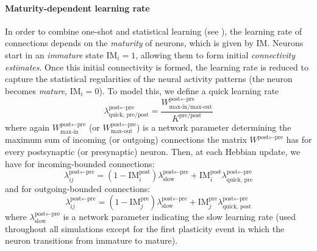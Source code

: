 \documentclass{article}
\begin{document}
\paragraph*{Maturity-dependent learning rate}
In order to combine one-shot and statistical learning (see ), the learning rate of connections depends on the \textit{maturity} of neurons, which is given by $\textrm{IM}$. Neurons start in an \textit{immature} state $\textrm{IM}_i = 1$, allowing them to form initial \textit{connectivity estimates}. Once this initial connectivity is formed, the learning rate is reduced to capture the statistical regularities of the neural activity patterns (the neuron becomes \textit{mature}, $\textrm{IM}_i = 0$). To model this, we define a quick learning rate
\begin{equation}
        \lambda^{\textrm{post}\leftarrow\textrm{pre}}_\textrm{quick, pre/post} = \frac{W^{\textrm{post}\leftarrow\textrm{pre}}_\textrm{max-in/max-out}}{K^\textrm{pre/post}} 
        \label{eq:quick_lambda}
\end{equation}
where again $W^{\textrm{post}\leftarrow\textrm{pre}}_\textrm{max-in}$ (or $W^{\textrm{post}\leftarrow\textrm{pre}}_\textrm{max-out}$) is a network parameter determining the maximum sum of incoming (or outgoing) connections the matrix $W^{\textrm{post}\leftarrow\textrm{pre}}$ has for every postsynaptic (or presynaptic) neuron. Then, at each Hebbian update, we have for incoming-bounded connections:
\begin{equation}
    \lambda_{ij}^{\textrm{post} \leftarrow \textrm{pre}} = (1 - \textrm{IM}^\textrm{post}_i)\lambda^{\textrm{post} \leftarrow \textrm{pre}}_\textrm{slow} + \textrm{IM}^\textrm{post}_i\lambda^{\textrm{post}\leftarrow\textrm{pre}}_\textrm{quick, pre}
\end{equation}
and for outgoing-bounded connections:
\begin{equation}
    \lambda_{ij}^{\textrm{post} \leftarrow \textrm{pre}} = (1 - \textrm{IM}^\textrm{pre}_j)\lambda^{\textrm{post} \leftarrow \textrm{pre}}_\textrm{slow} + \textrm{IM}^\textrm{pre}_j\lambda^{\textrm{post}\leftarrow\textrm{pre}}_\textrm{quick, post}
\end{equation}
where $\lambda^{\textrm{post} \leftarrow \textrm{pre}}_\textrm{slow}$ is a network parameter indicating the slow learning rate (used throughout all simulations except for the first plasticity event in which the neuron transitions from immature to mature).
\newline\newline
\end{document}
